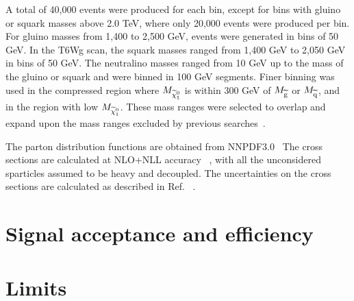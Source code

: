 A total of 40,000 events were produced for
each bin, except for bins with gluino or squark masses above 2.0 TeV, where only
20,000 events were produced per bin.
For gluino masses from 1,400 to 2,500 GeV, events were generated
in bins of 50 GeV.  In the T6Wg scan, the squark masses ranged from
1,400 GeV to 2,050 GeV in bins of 50 GeV.
The neutralino masses ranged from 10 GeV up to the mass
of the gluino or squark and were binned in
100 GeV segments. Finer binning was used in the compressed region where
$M_{\widetilde{\chi}^{0}_{1}}$ is within 300 GeV of $M_{\widetilde{\mathrm{g}}}$ or $M_{\widetilde{\mathrm{q}}}$,
and in the region with low $M_{\widetilde{\chi}^{0}_{1}}$.
These mass ranges were selected to overlap and
expand upon the mass ranges excluded by previous
searches~\cite{ATLAS:2016aa,CMS:2016_anal}.

The parton distribution
functions are obtained from NNPDF3.0~\cite{Ball:2014uwa}
The cross sections are calculated at NLO+NLL accuracy
~\cite{Kulesza:2009kq, Beenakker:2009ha},
with all the unconsidered sparticles assumed to be heavy and decoupled.
The uncertainties on the cross sections are calculated as
described in Ref. ~\cite{Borschensky:2014cia}.



\section{Signal acceptance and efficiency}

\section{Limits}
